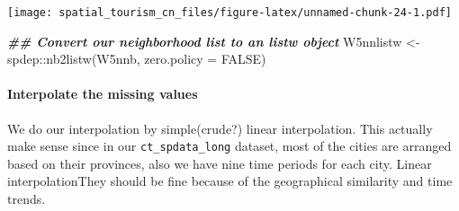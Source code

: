 \documentclass[
]{article}
\newenvironment{Shaded}{\begin{snugshade}}{\end{snugshade}}
\newcommand{\AttributeTok}[1]{\textcolor[rgb]{0.77,0.63,0.00}{#1}}
\newcommand{\ConstantTok}[1]{\textcolor[rgb]{0.00,0.00,0.00}{#1}}
\newcommand{\DecValTok}[1]{\textcolor[rgb]{0.00,0.00,0.81}{#1}}
\newcommand{\DocumentationTok}[1]{\textcolor[rgb]{0.56,0.35,0.01}{\textbf{\textit{#1}}}}
\newcommand{\FunctionTok}[1]{\textcolor[rgb]{0.00,0.00,0.00}{#1}}
\newcommand{\NormalTok}[1]{#1}
\newcommand{\OtherTok}[1]{\textcolor[rgb]{0.56,0.35,0.01}{#1}}
\newcommand{\SpecialCharTok}[1]{\textcolor[rgb]{0.00,0.00,0.00}{#1}}
\begin{document}
\begin{Shaded}
\end{Shaded}

\texttt{[image: spatial\_tourism\_cn\_files/figure-latex/unnamed-chunk-24-1.pdf]}

\begin{Shaded}
\begin{Highlighting}[]
\DocumentationTok{\#\# Convert our neighborhood list to an listw object}
\NormalTok{W5nnlistw }\OtherTok{\textless{}{-}}\NormalTok{ spdep}\SpecialCharTok{::}\FunctionTok{nb2listw}\NormalTok{(W5nnb, }\AttributeTok{zero.policy =} \ConstantTok{FALSE}\NormalTok{) }
\end{Highlighting}
\end{Shaded}

\hypertarget{interpolate-the-missing-values}{%
\paragraph{Interpolate the missing
values}\label{interpolate-the-missing-values}}

We do our interpolation by simple(crude?) linear interpolation. This
actually make sense since in our \texttt{ct\_spdata\_long} dataset, most
of the cities are arranged based on their provinces, also we have nine
time periods for each city. Linear interpolationThey should be fine
because of the geographical similarity and time trends.
\end{document}
